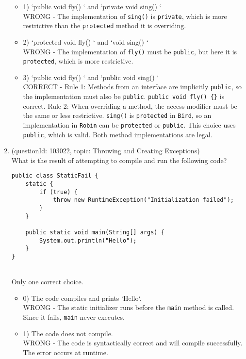 \documentclass[12pt]{article}
\begin{document}
\begin{enumerate}[label=(\arabic*)]
\begin{itemize}
\item 1) `public void fly() {}` and `private void sing() {}`
 \\ 
WRONG - The implementation of \verb|sing()| is \verb|private|, which is more restrictive than the \verb|protected| method it is overriding.

\item 2) `protected void fly() {}` and `void sing() {}`
 \\ 
WRONG - The implementation of \verb|fly()| must be \verb|public|, but here it is \verb|protected|, which is more restrictive.

\item 3) `public void fly() {}` and `public void sing() {}`
 \\ 
CORRECT - Rule 1: Methods from an interface are implicitly \verb|public|, so the implementation must also be \verb|public|. \verb|public void fly() {}| is correct. Rule 2: When overriding a method, the access modifier must be the same or less restrictive. \verb|sing()| is \verb|protected| in \verb|Bird|, so an implementation in \verb|Robin| can be \verb|protected| or \verb|public|. This choice uses \verb|public|, which is valid. Both method implementations are legal.

\end{itemize}
\item (questionId: 103022, topic: Throwing and Creating Exceptions) \\ 
What is the result of attempting to compile and run the following code?
\begin{verbatim}
public class StaticFail {
    static {
        if (true) {
            throw new RuntimeException("Initialization failed");
        }
    }

    public static void main(String[] args) {
        System.out.println("Hello");
    }
}
\end{verbatim}
\\ \noindent Only one correct choice. 
\begin{itemize}
\item 0) The code compiles and prints `Hello`.
 \\ 
WRONG - The static initializer runs before the \verb|main| method is called. Since it fails, \verb|main| never executes.

\item 1) The code does not compile.
 \\ 
WRONG - The code is syntactically correct and will compile successfully. The error occurs at runtime.


\end{itemize}
\end{enumerate}
\end{document}
